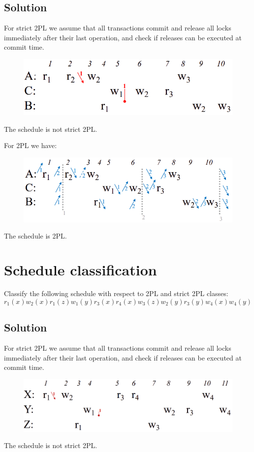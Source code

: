 \documentclass[12pt, a4paper]{report}
\newtheorem[style=M,bodystyle=\normalfont]{theorem}{Theorem}
\newtheorem[style=M,bodystyle=\normalfont]{corollary}{Corollary}
\newtheorem[style=M,bodystyle=\normalfont]{lemma}{Lemma}
\newtheorem[style=M,bodystyle=\normalfont]{definition}{Definition}
\begin{document}
    \subsection*{Solution}
        For strict 2PL we assume that all transactions commit and release all locks immediately after their last operation, and check if releases can be executed at commit time.
        \begin{figure}[H]
            \centering
            \includegraphics[width=0.75\linewidth]{images/2PL5.png}
        \end{figure}
        The schedule is not strict 2PL.

        For 2PL we have: 
        \begin{figure}[H]
            \centering
            \includegraphics[width=0.75\linewidth]{images/2PL6.png}
        \end{figure}
        The schedule is 2PL. 

    \newpage

    \section{Schedule classification}
        Classify the following schedule with respect to 2PL and strict 2PL classes: 
        \[r_1(x) w_2(x) r_1(z) w_1(y) r_3(x) r_4(x) w_3(z) w_2(y) r_3(y) w_4(x) w_4(y)\]
    \subsection*{Solution}
        For strict 2PL we assume that all transactions commit and release all locks immediately after their last operation, and check if releases can be executed at commit time.
        \begin{figure}[H]
            \centering
            \includegraphics[width=1\linewidth]{images/2PL7.png}
        \end{figure}
        The schedule is not strict 2PL.
\end{document}

